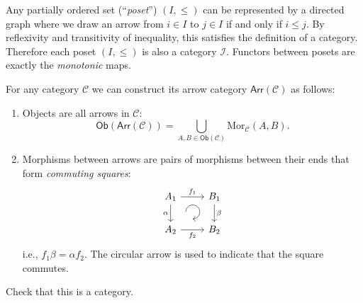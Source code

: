 %
\begin{example}\label{poset example}
    Any partially ordered set (``\emph{poset}'') $\left(I,\leq\right)$
    can be represented by a directed graph where we draw an arrow from
    $i\in I$ to $j\in I$ if and only if $i\leq j$. By reflexivity and
    transitivity of inequality, this satisfies the definition of a category.
    Therefore each poset $(I,\leq)$ is also a category $\mathcal{I}$.
    Functors between posets are exactly the \emph{monotonic} maps.
\end{example}
%
\begin{defn}
    For any category $\mathcal{C}$ we can construct its arrow category
    $\mathsf{Arr}\left(\mathcal{C}\right)$ as follows:
\begin{enumerate}
\item Objects are all arrows in $\mathcal{C}$: 
\[
\mathsf{Ob}\left(\mathsf{Arr}\left(\mathcal{C}\right)\right)=\bigcup_{A,B\in\mathsf{Ob}\left(\mathcal{C}\right)}\mathrm{Mor}_{\mathcal{C}}\left(A,B\right).
\]
\item Morphisms between arrows are pairs of morphisms between their ends
that form \emph{commuting squares}:
\[
\begin{tikzcd}[every matrix/.append style={name=m},   
execute at end picture={\draw [<-] ([xshift=-2.2em,yshift=.3em]m-2-2.north) arc[start angle=-90,delta angle=270,radius=0.25cm];}]
   A_1\arrow[r,"f_1" ]\arrow[d,swap,"\alpha" ]& B_1 \arrow[d,"\beta" ] \\
   A_2\arrow[r,swap,"f_2" ]& B_2
\end{tikzcd}\]
i.e., $f_{1}\beta=\alpha f_{2}$. The circular arrow is used to indicate
that the square commutes. %
\end{enumerate}
\end{defn}
\begin{xca}
    Check that this is a category.
\end{xca}
